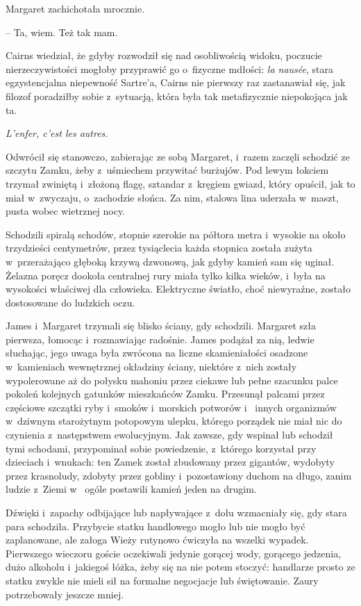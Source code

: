 \documentclass[oneside,polish,12pt,sfheadings]{mwbk}
\begin{document}
Margaret zachichotała mrocznie. 

-- Ta, wiem. Też tak mam.

Cairns wiedział, że gdyby rozwodził się nad osobliwością widoku,
poczucie nierzeczywistości mogłoby przyprawić go o~fizyczne mdłości:
\emph{la nausée}, stara egzystencjalna niepewność Sartre'a, Cairns nie
pierwszy raz zastanawiał się, jak filozof poradziłby sobie z~sytuacją,
która była tak metafizycznie niepokojąca jak ta.

\emph{L'enfer, c'est les autres. }

Odwrócił się stanowczo, zabierając ze sobą Margaret, i~razem zaczęli
schodzić ze szczytu Zamku, żeby z~uśmiechem przywitać burżujów. Pod
lewym łokciem trzymał zwiniętą i~złożoną flagę, sztandar z~kręgiem
gwiazd, który opuścił, jak to miał w~zwyczaju, o~zachodzie słońca. Za
nim, stalowa lina uderzała w~maszt, pusta wobec wietrznej nocy.

Schodzili spiralą schodów, stopnie szerokie na półtora metra i~wysokie
na około trzydzieści centymetrów, przez tysiąclecia każda stopnica
została zużyta w~przerażająco głęboką krzywą dzwonową, jak gdyby kamień
sam się uginał. Żelazna poręcz dookoła centralnej rury miała tylko kilka
wieków, i~była na wysokości właściwej dla człowieka. Elektryczne
światło, choć niewyraźne, zostało dostosowane do ludzkich oczu.

James i~Margaret trzymali się blisko ściany, gdy schodzili. Margaret
szła pierwsza, łomocąc i~rozmawiając radośnie. James podążał za nią,
ledwie słuchając, jego uwaga była zwrócona na liczne skamieniałości
osadzone w~kamieniach wewnętrznej okładziny ściany, niektóre z~nich
zostały wypolerowane aż do połysku mahoniu przez ciekawe lub pełne
szacunku palce pokoleń kolejnych gatunków mieszkańców Zamku. Przesunął
palcami przez częściowe szczątki ryby i~smoków i~morskich potworów i~
innych organizmów w~dziwnym starożytnym potopowym ulepku, którego
porządek nie miał nic do czynienia z~następstwem ewolucyjnym. Jak
zawsze, gdy wspinał lub schodził tymi schodami, przypominał sobie
powiedzenie, z~którego korzystał przy dzieciach i~wnukach: ten Zamek
został zbudowany przez gigantów, wydobyty przez krasnoludy, zdobyty
przez gobliny i~pozostawiony duchom na długo, zanim ludzie z~Ziemi w~
ogóle postawili kamień jeden na drugim.

Dźwięki i~zapachy odbijające lub napływające z~dołu wzmacniały się, gdy
stara para schodziła. Przybycie statku handlowego mogło lub nie mogło
być zaplanowane, ale załoga Wieży rutynowo ćwiczyła na wszelki wypadek.
Pierwszego wieczoru goście oczekiwali jedynie gorącej wody, gorącego
jedzenia, dużo alkoholu i~jakiegoś łóżka, żeby się na nie potem stoczyć:
handlarze prosto ze statku zwykle nie mieli sił na formalne negocjacje
lub świętowanie. Zaury potrzebowały jeszcze mniej.
\end{document}
